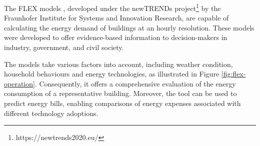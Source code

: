 The FLEX models \cite{newtrends}, developed under the newTRENDs project\footnote{https://newtrends2020.eu/} by the Fraunhofer Institute for Systems and Innovation Research, 
are capable of calculating the energy demand of buildings at an hourly resolution. 
These models were developed to offer evidence-based information to decision-makers in industry, government, and civil society. 

The models take various factors into account, including weather condition, household behaviours and energy technologies, as illustrated in Figure \ref{fig:flex-operation}.
Consequently, it offers a comprehensive evaluation of the energy consumption of a representative building. 
Moreover, the tool can be used to predict energy bills, enabling comparisons of energy expenses associated with different technology adoptions. 



